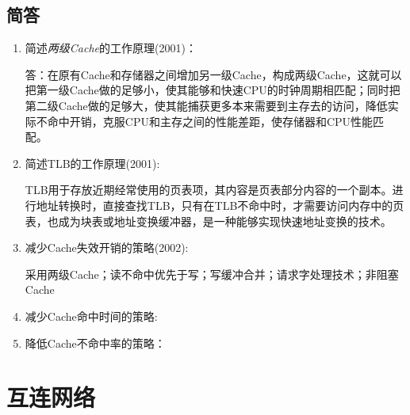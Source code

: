 \documentclass[a4paper]{ctexart}
\begin{document}
\subsection{简答}
\begin{enumerate}
  \item 简述\emph{两级Cache}的工作原理(2001)：
  
  答：在原有Cache和存储器之间增加另一级Cache，构成两级Cache，这就可以把第一级Cache做的足够小，使其能够和快速CPU的时钟周期相匹配；同时把第二级Cache做的足够大，使其能捕获更多本来需要到主存去的访问，降低实际不命中开销，克服CPU和主存之间的性能差距，使存储器和CPU性能匹配。

  \item 简述TLB的工作原理(2001):
  
  TLB用于存放近期经常使用的页表项，其内容是页表部分内容的一个副本。进行地址转换时，直接查找TLB，只有在TLB不命中时，才需要访问内存中的页表，也成为块表或地址变换缓冲器，是一种能够实现快速地址变换的技术。
  
  \item 减少Cache失效开销的策略(2002):

  采用两级Cache；读不命中优先于写；写缓冲合并；请求字处理技术；非阻塞Cache

  \item 减少Cache命中时间的策略:
  \item 降低Cache不命中率的策略：
\end{enumerate}

\newpage
\section{互连网络}
\end{document}
